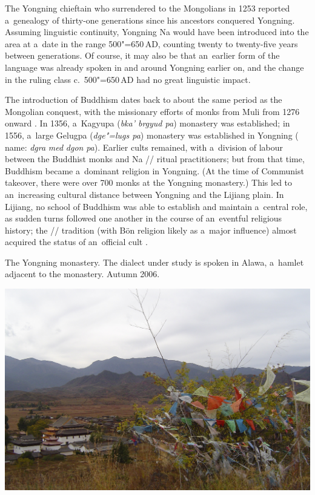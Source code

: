 The Yongning chieftain who surrendered to the Mongolians in 1253 reported a~genealogy of thirty-one generations since his ancestors conquered Yongning. Assuming linguistic continuity, Yongning Na would have been introduced into the area at a~date in the range 500"=650\,AD, counting twenty to twenty-five years between generations. Of course, it may also be that an~earlier form of the language was already spoken in and around Yongning earlier on, and the change in the ruling class c.~500"=650\,AD had no great linguistic impact.

The introduction of  Buddhism dates back to about the same period as the Mongolian conquest, with the missionary
efforts of monks from Muli from 1276 onward \citep[389]{guoetal1994}. In 1356, a~Kagyupa (\textit{bka' brgyud pa})
monastery was established; in 1556, a~large Gelugpa (\textit{dge"=lugs pa}) monastery was established
in Yongning ( name: \textit{dgra} \textit{med} \textit{dgon} \textit{pa}). Earlier cults
remained, with a~division of labour between the Buddhist monks and Na // ritual
practitioners; but from that time, Buddhism became a~dominant religion in Yongning. (At the time of
Communist takeover, there were over 700 monks at the Yongning monastery.) This led to
an~increasing cultural distance between Yongning and the Lijiang plain. In Lijiang, no school of
 Buddhism was able to establish and maintain a~central role, as sudden turns followed one
another in the course of an~eventful religious history; the  // tradition (with  Bön religion likely as a~major influence) almost acquired the status of an~official cult \citep{jackson1979}.

\begin{photofigure}[t!!]
	\caption{The Yongning monastery. The dialect under study is spoken in Alawa, a~hamlet adjacent to the monastery. Autumn 2006.}
	\includegraphics[width=\textwidth]{figures/MonasteryAndPlain.jpg}
\end{photofigure}

